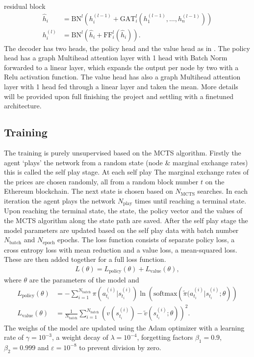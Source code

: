 residual block
\begin{align}
    \hat{h}_{i} &= \text{BN}^{l}\left( h_i^{(l-1)}
    + \text{GAT}_i^{l}(h_1^{(l-1)},\ldots,h_n^{(l-1)})\right)\\
    h_i^{(l)} &= \text{BN}^{l}\left( \hat{h}_{i} + \text{FF}_i^{l}(\hat{h}_i) \right).
\end{align}
The decoder has two heads, the policy head and the value head as in
\cite{alphazero}. The policy head has a graph Multihead attention layer with
1 head with Batch Norm forwarded to a linear layer, which expands the output
per node by two with a Relu activation function. The value head has also a
graph Multihead attention layer with 1 head fed through a linear layer and
taken the mean. More details will be provided upon full finishing the project
and settling with a finetuned architecture.
\subsection{Training}
The training is purely unsupervised based on the MCTS algorithm. Firstly the
agent `plays' the network from a random state (node \& marginal exchange
rates) this is called the self play stage. At each self play The marginal
exchange rates of the prices are chosen randomly, all from a random block
number $t$ on the Ethereum blockchain. The next state is chosen based on
$N_{\text{MCTS}}$ searches. In each iteration the agent plays the network
$N_{\text{play} }$ times until reaching a terminal state. Upon reaching the
terminal state, the state, the policy vector and the values of the MCTS
algorithm along the state path are saved. After the self play stage the model
parameters are updated based on the self play data with batch number
$N_{\text{batch} }$ and $N_{\text{epoch} }$ epochs. The loss function
consists of separate policy loss, a cross entropy loss with mean
reduction and a value loss, a mean-squared loss. These are then added
together for a full loss function.
\begin{align}
    L(\theta) = L_{\text{policy}}(\theta) + L_{\text{value}}(\theta),
\end{align}
where $\theta$ are the parameters of the model and
\begin{align}
    L_{\text{policy}} (\theta) &= - \sum_{i=1}^{N_{\text{batch}}}
    \pi(a^{(i)}_{t_i} |s ^{(i)}_{t_i})
    \ln \left(\text{softmax}\left(\tilde{\pi}(a^{(i)}_{t_i}|s^{(i)}_{t_i};
        \theta\right)\right) \\
    L_{\text{value}} (\theta) &= \frac{1}{N_{\text{batch}}}
    \sum_{i=1}^{N_{\text{batch}}}
    \left( v(s^{(i)}_{t_i}) - \tilde{v}(s^{(i)}_{t_i}; \theta)  \right)^{2}.
\end{align}
The weighs of the model are updated using the Adam optimizer \cite{adam} with
a learning rate of $\gamma = 10^{-3} $, a weight decay of $\lambda =
10^{-4}$, forgetting factors $\beta_1 = 0.9$, $\beta_2 = 0.999$ and
$\varepsilon = 10^{-8}$ to prevent division by zero.
\newline

